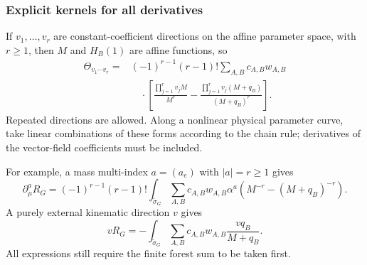 \documentclass[11pt,a4paper,oneside]{article}
\theoremstyle{plain}
\theoremstyle{definition}
\theoremstyle{remark}
\numberwithin{equation}{section}
\begin{document}
\subsubsection{Explicit kernels for all derivatives}
If $v_1,\ldots,v_r$ are constant-coefficient directions on the affine parameter space, with $r\geq1$, then $M$ and $H_B(1)$ are affine functions, so
\begin{align}\label{descent:eq:allorders}
 \Theta_{v_1\cdots v_r}
 ={}&(-1)^{r-1}(r-1)!\sum_{A,B}c_{A,B}w_{A,B}\nonumber\\[-2pt]
 &\quad\cdot\left[
 \frac{\prod_{j=1}^r v_jM}{M^r}
 -\frac{\prod_{j=1}^r v_j(M+q_B)}{(M+q_B)^r}
 \right].
\end{align}
Repeated directions are allowed. Along a nonlinear physical parameter curve, take linear combinations of these forms according to the chain rule; derivatives of the vector-field coefficients must be included.

For example, a mass multi-index $a=(a_e)$ with $|a|=r\geq1$ gives
\begin{equation}\label{descent:eq:massderivative}
 \partial_\mu^a R_G
 =(-1)^{r-1}(r-1)!\int_{\widetilde\sigma_G}
   \sum_{A,B}c_{A,B}w_{A,B}\alpha^a
       \left(M^{-r}-(M+q_B)^{-r}\right).
\end{equation}
A purely external kinematic direction $v$ gives
\begin{equation}\label{descent:eq:kinematic}
 vR_G=-\int_{\widetilde\sigma_G}
             \sum_{A,B}c_{A,B}w_{A,B}\frac{vq_B}{M+q_B}.
\end{equation}
All expressions still require the finite forest sum to be taken first.
\end{document}
